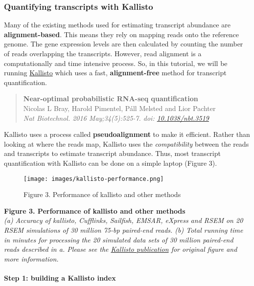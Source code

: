 \documentclass[11pt]{article}
\begin{document}
    \hypertarget{quantifying-transcripts-with-kallisto}{%
\subsubsection{Quantifying transcripts with
Kallisto}\label{quantifying-transcripts-with-kallisto}}

Many of the existing methods used for estimating transcript abundance
are \textbf{alignment-based}. This means they rely on mapping reads onto
the reference genome. The gene expression levels are then calculated by
counting the number of reads overlapping the transcripts. However, read
alignment is a computationally and time intensive process. So, in this
tutorial, we will be running
\href{https://pachterlab.github.io/kallisto/}{Kallisto} which uses a
fast, \textbf{alignment-free} method for transcript quantification.

\begin{quote}
\textbf{Near-optimal probabilistic RNA-seq quantification}\\
Nicolas L Bray, Harold Pimentel, Páll Melsted and Lior Pachter\\
\textit{Nat Biotechnol. 2016 May;34(5):525-7. doi:
\href{https://www.nature.com/articles/nbt.3519}{10.1038/nbt.3519}}
\end{quote}

Kallisto uses a process called \textbf{pseudoalignment} to make it
efficient. Rather than looking at where the reads map, Kallisto uses the
\textit{compatibility} between the reads and transcripts to estimate
transcript abundance. Thus, most transcript quantification with Kallisto
can be done on a simple laptop (Figure 3).

    \begin{figure}[!h]
\centering
\texttt{[image: images/kallisto-performance.png]}
\caption{Figure 3. Performance of kallisto and other methods}
\end{figure}

    \textbf{Figure 3. Performance of kallisto and other methods}\\
\textit{(a) Accuracy of kallisto, Cufflinks, Sailfish, EMSAR, eXpress and
RSEM on 20 RSEM simulations of 30 million 75-bp paired-end reads. (b)
Total running time in minutes for processing the 20 simulated data sets
of 30 million paired-end reads described in a. Please see the
\href{https://www.nature.com/articles/nbt.3519}{Kallisto publication}
for original figure and more information.}

    \hypertarget{step-1-building-a-kallisto-index}{%
\paragraph{Step 1: building a Kallisto
index}\label{step-1-building-a-kallisto-index}}
\end{document}
